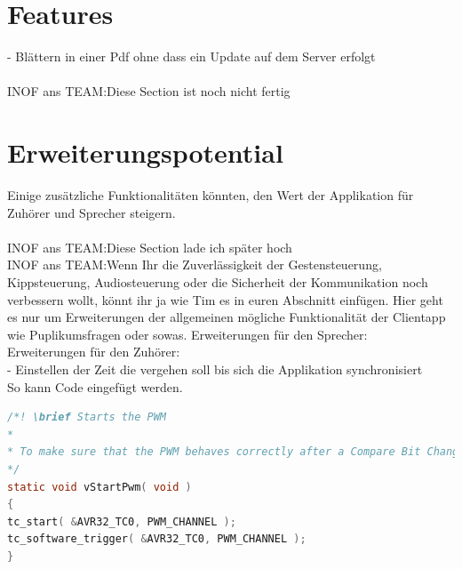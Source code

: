 \section{Features}
- Blättern in einer Pdf ohne dass ein Update auf dem Server erfolgt\\
\\INOF ans TEAM:Diese Section ist noch nicht fertig
\section{Erweiterungspotential}
Einige zusätzliche Funktionalitäten könnten, den Wert der Applikation für Zuhörer und Sprecher steigern.\\
\\INOF ans TEAM:Diese Section lade ich später hoch
\\INOF ans TEAM:Wenn Ihr die Zuverlässigkeit der Gestensteuerung, Kippsteuerung, Audiosteuerung oder die Sicherheit der Kommunikation noch verbessern wollt, könnt ihr ja wie Tim es in euren Abschnitt einfügen. Hier geht es nur um Erweiterungen der allgemeinen mögliche Funktionalität der Clientapp wie Puplikumsfragen oder sowas.
Erweiterungen für den Sprecher:\\

Erweiterungen für den Zuhörer:\\
- Einstellen der Zeit die vergehen soll bis sich die Applikation synchronisiert\\






\newpage
So kann Code eingefügt werden.
\begin{lstlisting}[frame=single,breaklines=true,basicstyle=\tiny,language=C,label={PWMStart},caption={Kommentierter Start der PWM}]
/*! \brief Starts the PWM
* 
* To make sure that the PWM behaves correctly after a Compare Bit Change the PWM is started and reset with a software trigger.
*/
static void vStartPwm( void )
{
tc_start( &AVR32_TC0, PWM_CHANNEL );
tc_software_trigger( &AVR32_TC0, PWM_CHANNEL );
}
\end{lstlisting}